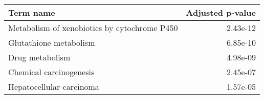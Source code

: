 \begin{tabular}{lr}
\toprule
                                   Term name &  Adjusted p-value \\
\midrule
Metabolism of xenobiotics by cytochrome P450 &          2.43e-12 \\
                      Glutathione metabolism &          6.85e-10 \\
                             Drug metabolism &          4.98e-09 \\
                     Chemical carcinogenesis &          2.45e-07 \\
                    Hepatocellular carcinoma &          1.57e-05 \\
\bottomrule
\end{tabular}
